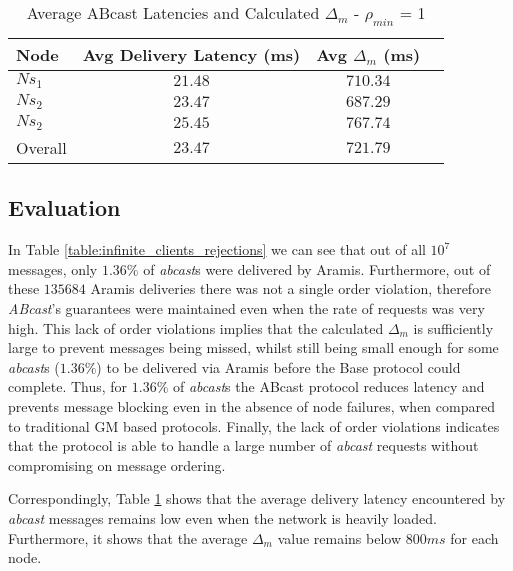 \begin{table}[p]
  \begin{center}
  \renewcommand{\arraystretch}{1.3}
   \begin{tabular}{|l|c|c|c|}
    \hline
    Node      & Avg Delivery Latency (ms) & Avg $\Delta_m$ (ms) \\ \hline \hline
    $Ns_1$   & $21.48$                           & $710.34$                   \\ \hline
    $Ns_2$   & $23.47$                           & $687.29$                  \\ \hline
    $Ns_2$   & $25.45$                           & $767.74$                   \\ \hline \hline
    Overall   & $23.47$                           & $721.79$                 \\ \hline
    \end{tabular}
    \caption{Average \textsf{ABcast} Latencies and Calculated $\Delta_m$ - $\rho_{min}$ = 1}
    \label{table:infinite_clients_aramis_latencies}
  \end{center}
\end{table}       

    \subsection{Evaluation}
    In Table \ref{table:infinite_clients_rejections} we can see that out of all $10^7$ messages, only $1.36\%$ of \emph{abcast}s were delivered by \textsf{Aramis}.  Furthermore, out of these $135684$ \textsf{Aramis} deliveries there was not a single order violation, therefore \emph{ABcast}'s guarantees were maintained even when the rate of requests was very high.  This lack of order violations implies that the calculated $\Delta_m$ is sufficiently large to prevent messages being missed, whilst still being small enough for some \emph{abcast}s ($1.36\%$) to be delivered via \textsf{Aramis} before the \textsf{Base} protocol could complete.  Thus, for $1.36\%$ of \emph{abcast}s the \textsf{ABcast} protocol reduces latency and prevents message blocking even in the absence of node failures, when compared to traditional GM based protocols.  Finally, the lack of order violations indicates that the protocol is able to handle a large number of \emph{abcast} requests without compromising on message ordering.  
       
    Correspondingly, Table \ref{table:infinite_clients_aramis_latencies} shows that the average delivery latency encountered by \emph{abcast} messages remains low even when the network is heavily loaded.  Furthermore, it shows that the average $\Delta_m$ value remains below $800ms$ for each node.  
    
